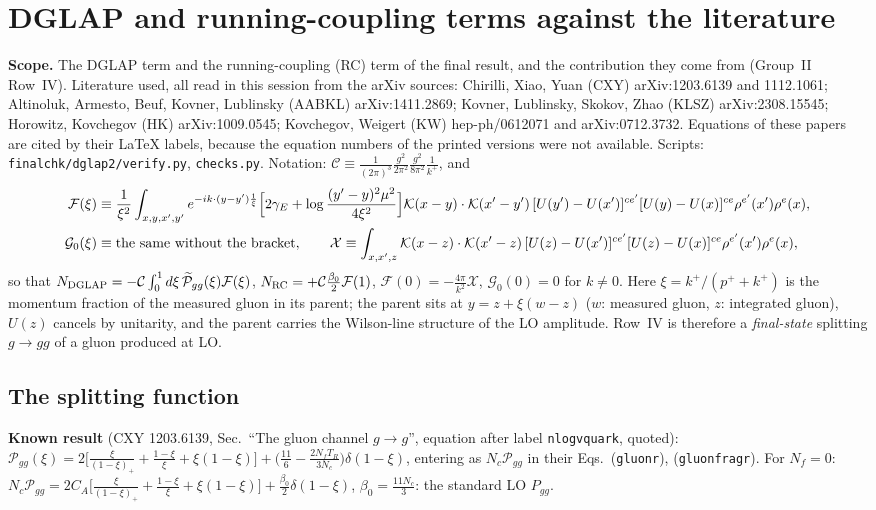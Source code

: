 \section{DGLAP and running-coupling terms against the literature}
\label{sec:dglap-lit}

\noindent\textbf{Scope.} The DGLAP term and the running-coupling (RC) term of the final result, and the contribution they come from (Group~II Row~IV). Literature used, all read in this session from the arXiv sources: Chirilli, Xiao, Yuan (CXY) arXiv:1203.6139 and 1112.1061; Altinoluk, Armesto, Beuf, Kovner, Lublinsky (AABKL) arXiv:1411.2869; Kovner, Lublinsky, Skokov, Zhao (KLSZ) arXiv:2308.15545; Horowitz, Kovchegov (HK) arXiv:1009.0545; Kovchegov, Weigert (KW) hep-ph/0612071 and arXiv:0712.3732. Equations of these papers are cited by their \LaTeX{} labels, because the equation numbers of the printed versions were not available. Scripts: \texttt{finalchk/dglap2/verify.py}, \texttt{checks.py}. Notation: $\mathcal{C}\equiv\frac{1}{(2\pi)^{3}}\frac{g^{2}}{2\pi^{2}}\frac{g^{2}}{8\pi^{2}}\frac{1}{k^{+}}$, and
\begin{align}
\mathcal{F}(\xi)&\equiv\frac{1}{\xi^{2}}\int_{x,y,x',y'}e^{-ik\cdot(y-y')\frac{1}{\xi}}\Big[2\gamma_{E}+\log\frac{(y'-y)^{2}\mu^{2}}{4\xi^{2}}\Big]\mathcal{K}(x-y)\cdot\mathcal{K}(x'-y')\,[U(y')-U(x')]^{ce'}[U(y)-U(x)]^{ce}\rho^{e'}(x')\rho^{e}(x),\notag\\
\mathcal{G}_{0}(\xi)&\equiv\text{the same without the bracket},\qquad \mathcal{X}\equiv\int_{x,x',z}\mathcal{K}(x-z)\cdot\mathcal{K}(x'-z)\,[U(z)-U(x')]^{ce'}[U(z)-U(x)]^{ce}\rho^{e'}(x')\rho^{e}(x),
\end{align}
so that $N_{\rm DGLAP}=-\mathcal{C}\int_{0}^{1}d\xi\,\widetilde{\mathcal P}_{gg}(\xi)\mathcal{F}(\xi)$, $N_{\rm RC}=+\mathcal{C}\frac{\beta_{0}}{2}\mathcal{F}(1)$, $\mathcal{F}(0)=-\frac{4\pi}{k^{2}}\mathcal{X}$, $\mathcal{G}_{0}(0)=0$ for $k\neq0$. Here $\xi=k^{+}/(p^{+}+k^{+})$ is the momentum fraction of the measured gluon in its parent; the parent sits at $y=z+\xi(w-z)$ ($w$: measured gluon, $z$: integrated gluon), $U(z)$ cancels by unitarity, and the parent carries the Wilson-line structure of the LO amplitude. Row~IV is therefore a \emph{final-state} splitting $g\to gg$ of a gluon produced at LO.

\subsection{The splitting function}

\noindent\textbf{Known result} (CXY 1203.6139, Sec.\ ``The gluon channel $g\to g$'', equation after label \texttt{nlogvquark}, quoted): $\mathcal{P}_{gg}(\xi)=2\big[\frac{\xi}{(1-\xi)_{+}}+\frac{1-\xi}{\xi}+\xi(1-\xi)\big]+\big(\frac{11}{6}-\frac{2N_{f}T_{R}}{3N_{c}}\big)\delta(1-\xi)$, entering as $N_{c}\mathcal{P}_{gg}$ in their Eqs.~(\texttt{gluonr}), (\texttt{gluonfragr}). For $N_{f}=0$: $N_{c}\mathcal{P}_{gg}=2C_{A}\big[\frac{\xi}{(1-\xi)_{+}}+\frac{1-\xi}{\xi}+\xi(1-\xi)\big]+\frac{\beta_{0}}{2}\delta(1-\xi)$, $\beta_{0}=\frac{11N_{c}}{3}$: the standard LO $P_{gg}$.

